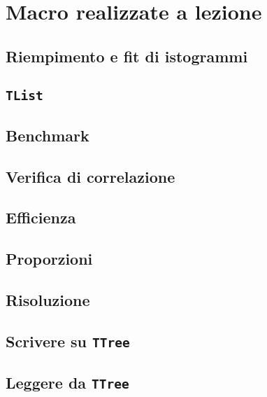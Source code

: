 \documentclass{article}
\begin{document}
\section{Macro realizzate a lezione}

\subsection{Riempimento e fit di istogrammi}


\subsection{\texttt{TList}}


\subsection{Benchmark}


\subsection{Verifica di correlazione}


\subsection{Efficienza}


\subsection{Proporzioni}


\subsection{Risoluzione}


\subsection{Scrivere su \texttt{TTree}}


\subsection{Leggere da \texttt{TTree}}

\end{document}
